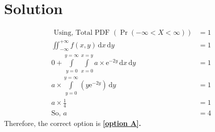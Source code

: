 \documentclass[journal,12pt,twocolumn]{IEEEtran}
\providecommand{\pr}[1]{\ensuremath{\Pr\left(#1\right)}}
\providecommand{\brak}[1]{\ensuremath{\left(#1\right)}}
\begin{document}
\section*{Solution}
\begin{align}
 \text{ Using, Total PDF } (\pr{-\infty < X < \infty}) &= 1  \\
\iint_{-\infty}^{+\infty}  f(x,y) \, \mathrm{d}x \, \mathrm{d}y &= 1 \\
 0 + \int \limits_{y=0}^{y=\infty} \int \limits_{x=0}^{x=y} a \times \mathrm{e}^{-2y} \, \mathrm{d}x\, \mathrm{d}y  &= 1 \\
  a \times \int \limits_{y=0}^{y=\infty}  \brak{y\mathrm{e}^{-2y} } \, \mathrm{d}y &= 1 \\
a \times \frac{1}{4} &= 1 \\
\text{So,  } a &= 4
\end{align}
 Therefore, the correct option is \textbf{\ref{option A}.}  

\end{document}
